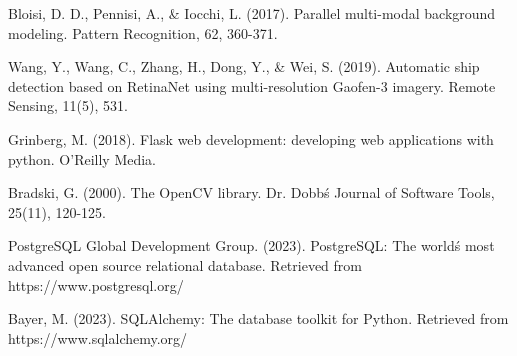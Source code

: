 \documentclass[twoside]{article}
\begin{document}
\begin{multicols}{2}
\begin{thebibliography}{99}
Bloisi, D. D., Pennisi, A., \& Iocchi, L. (2017). Parallel multi-modal background modeling. Pattern Recognition, 62, 360-371.

Wang, Y., Wang, C., Zhang, H., Dong, Y., \& Wei, S. (2019). Automatic ship detection based on RetinaNet using multi-resolution Gaofen-3 imagery. Remote Sensing, 11(5), 531.

Grinberg, M. (2018). Flask web development: developing web applications with python. O'Reilly Media.

Bradski, G. (2000). The OpenCV library. Dr. Dobb\'s Journal of Software Tools, 25(11), 120-125.

PostgreSQL Global Development Group. (2023). PostgreSQL: The world\'s most advanced open source relational database. Retrieved from https://www.postgresql.org/

Bayer, M. (2023). SQLAlchemy: The database toolkit for Python. Retrieved from https://www.sqlalchemy.org/

\end{thebibliography}

\label{last-page}
\end{multicols}
\label{last-page}
\end{document}
